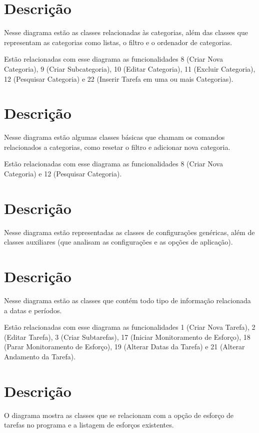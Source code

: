 \section{Descrição}
	Nesse diagrama estão as classes relacionadas às categorias, além das classes que representam as categorias como listas, o filtro e o ordenador de categorias.
	
	Estão relacionadas com esse diagrama as funcionalidades 8 (Criar Nova Categoria), 9 (Criar Subcategoria), 10 (Editar Categoria), 11 (Excluir Categoria), 12 (Pesquisar Categoria) e 22 (Inserir Tarefa em uma ou mais Categorias).

\section{Descrição}
	Nesse diagrama estão algumas classes básicas que chamam os comandos relacionados a categorias, como resetar o filtro e adicionar nova categoria.
	
	Estão relacionadas com esse diagrama as funcionalidades 8 (Criar Nova Categoria) e 12 (Pesquisar Categoria).

\section{Descrição}
	Nesse diagrama estão representadas as classes de configurações genéricas, além de classes auxiliares (que analisam as configurações e as opções de aplicação).

\section{Descrição}
	Nesse diagrama estão as classes que contém todo tipo de informação relacionada a datas e períodos.
	
	Estão relacionadas com esse diagrama as funcionalidades 1 (Criar Nova Tarefa), 2 (Editar Tarefa), 3 (Criar Subtarefas), 17 (Iniciar Monitoramento de Esforço), 18 (Parar Monitoramento de Esforço), 19 (Alterar Datas da Tarefa) e 21 (Alterar Andamento da Tarefa).

\section{Descrição}
	O diagrama mostra as classes que se relacionam com a opção de esforço de tarefas no programa e a listagem de esforços existentes.
	
